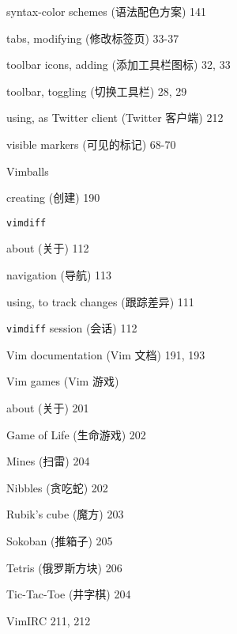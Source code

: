 \begin{multicols}{2}
\hangindent=3pc \quad syntax-color schemes (语法配色方案) 141 \par
\hangindent=3pc \quad tabs, modifying (修改标签页) 33-37 \par
\hangindent=3pc \quad toolbar icons, adding (添加工具栏图标) 32, 33 \par
\hangindent=3pc \quad toolbar, toggling (切换工具栏) 28, 29 \par
\hangindent=3pc \quad using, as Twitter client (Twitter 客户端) 212 \par
\hangindent=3pc \quad visible markers (可见的标记) 68-70 \par

\hangindent=3pc  Vimballs \par
\hangindent=3pc \quad creating (创建) 190 \par

\hangindent=3pc  \texttt{vimdiff} \par
\hangindent=3pc \quad about (关于) 112 \par
\hangindent=3pc \quad navigation (导航) 113 \par
\hangindent=3pc \quad using, to track changes (跟踪差异) 111 \par

\hangindent=3pc  \texttt{vimdiff} session (会话) 112

\hangindent=3pc  Vim documentation (Vim 文档) 191, 193

\hangindent=3pc  Vim games (Vim 游戏) \par
\hangindent=3pc \quad about (关于) 201 \par
\hangindent=3pc \quad Game of Life (生命游戏) 202 \par
\hangindent=3pc \quad Mines (扫雷) 204 \par
\hangindent=3pc \quad Nibbles (贪吃蛇) 202 \par
\hangindent=3pc \quad Rubik's cube (魔方) 203 \par
\hangindent=3pc \quad Sokoban (推箱子) 205 \par
\hangindent=3pc \quad Tetris (俄罗斯方块) 206 \par
\hangindent=3pc \quad Tic-Tac-Toe (井字棋) 204 \par

\hangindent=3pc  VimIRC 211, 212


\end{multicols}
